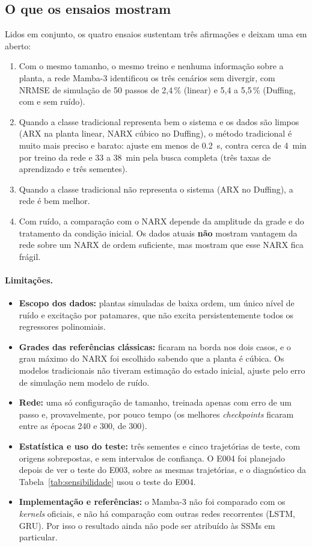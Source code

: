 \documentclass[11pt,a4paper]{article}
\begin{document}
\subsection{O que os ensaios mostram}

Lidos em conjunto, os quatro ensaios sustentam três afirmações e deixam uma em aberto:
\begin{enumerate}\itemsep0pt
  \item Com o mesmo tamanho, o mesmo treino e nenhuma informação sobre a planta, a rede Mamba-3
  identificou os três cenários sem divergir, com NRMSE de simulação de 50 passos de 2,4\,\% (linear)
  e 5,4 a 5,5\,\% (Duffing, com e sem ruído).
  \item Quando a classe tradicional representa bem o sistema e os dados são limpos (ARX na planta
  linear, NARX cúbico no Duffing), o método tradicional é muito mais preciso e barato: ajuste em menos
  de \SI{0,2}{s}, contra cerca de \SI{4}{min} por treino da rede e 33 a \SI{38}{min} pela busca
  completa (três taxas de aprendizado e três sementes).
  \item Quando a classe tradicional não representa o sistema (ARX no Duffing), a rede é bem melhor.
  \item Com ruído, a comparação com o NARX depende da amplitude da grade e do tratamento da condição
  inicial. Os dados atuais \textbf{não} mostram vantagem da rede sobre um NARX de ordem suficiente,
  mas mostram que esse NARX fica frágil.
\end{enumerate}

\paragraph{Limitações.}
\begin{itemize}\itemsep0pt
  \item \textbf{Escopo dos dados:} plantas simuladas de baixa ordem, um único nível de ruído e
  excitação por patamares, que não excita persistentemente todos os regressores polinomiais.
  \item \textbf{Grades das referências clássicas:} ficaram na borda nos dois casos, e o grau máximo do
  NARX foi escolhido sabendo que a planta é cúbica. Os modelos tradicionais não tiveram estimação do
  estado inicial, ajuste pelo erro de simulação nem modelo de ruído.
  \item \textbf{Rede:} uma só configuração de tamanho, treinada apenas com erro de um passo e,
  provavelmente, por pouco tempo (os melhores \emph{checkpoints} ficaram entre as épocas 240 e 300,
  de 300).
  \item \textbf{Estatística e uso do teste:} três sementes e cinco trajetórias de teste, com origens
  sobrepostas, e sem intervalos de confiança. O E004 foi planejado depois de ver o teste do E003, sobre
  as mesmas trajetórias, e o diagnóstico da Tabela~\ref{tab:sensibilidade} usou o teste do E004.
  \item \textbf{Implementação e referências:} o Mamba-3 não foi comparado com os \emph{kernels}
  oficiais, e não há comparação com outras redes recorrentes (LSTM, GRU). Por isso o resultado ainda
  não pode ser atribuído às SSMs em particular.
\end{itemize}
\end{document}
